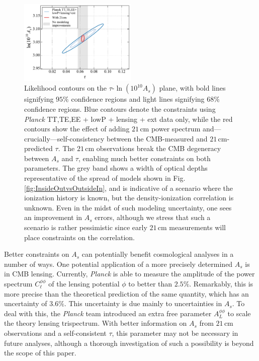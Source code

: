\documentclass[twocolumn,aps,prd,nofootinbib,showpacs,superscriptaddress]{revtex4-1}
\begin{document}
\begin{figure}[!]
\centering
\includegraphics[width=0.5\textwidth]{figures/AsTau_w21cm.pdf}
\caption{Likelihood contours on the $\tau$-$\ln (10^{10} A_s)$ plane, with bold lines signifying $95\%$ confidence regions and light lines signifying $68\%$ confidence regions. Blue contours denote the constraints using \emph{Planck} TT,TE,EE + lowP + lensing + ext data only, while the red contours show the effect of adding $21\,\textrm{cm}$ power spectrum and---crucially---self-consistency between the CMB-measured and $21\,\textrm{cm}$-predicted $\tau$. The $21\,\textrm{cm}$ observations break the CMB degeneracy between $A_s$ and $\tau$, enabling much better constraints on both parameters. The grey band shows a width of optical depths representative of the spread of models shown in Fig. \ref{fig:InsideOutvsOutsideIn}, and is indicative of a scenario where the ionization history is known, but the density-ionization correlation is unknown. Even in the midst of such modeling uncertainty, one sees an improvement in $A_s$ errors, although we stress that such a scenario is rather pessimistic since early $21\,\textrm{cm}$ measurements will place constraints on the correlation.}
\label{fig:AsTau_w21cm}
\end{figure}

Better constraints on $A_s$ can potentially benefit cosmological analyses in a number of ways. One potential application of a more precisely determined $A_s$ is in CMB lensing. Currently, \emph{Planck} is able to measure the amplitude of the power spectrum $C_\ell^{\phi \phi}$ of the lensing potential $\phi$ to better than $2.5\%$. Remarkably, this is more precise than the theoretical prediction of the same quantity, which has an uncertainty of $3.6\%$. This uncertainty is due mainly to uncertainties in $A_s$. To deal with this, the \emph{Planck} team introduced an extra free parameter $A_L^{\phi \phi}$ to scale the theory lensing trispectrum. With better information on $A_s$ from $21\,\textrm{cm}$ observations and a self-consistent $\tau$, this parameter may not be necessary in future analyses, although a thorough investigation of such a possibility is beyond the scope of this paper.
\end{document}
